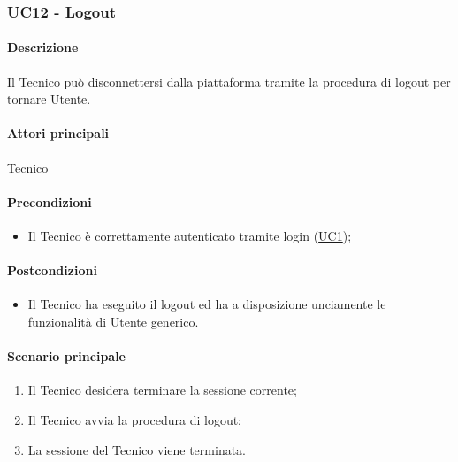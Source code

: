 \subsubsection{UC12 - Logout}\label{UC12}
\paragraph*{Descrizione}
Il Tecnico può disconnettersi dalla piattaforma tramite la procedura di logout per tornare Utente.

\paragraph*{Attori principali}
Tecnico

\paragraph*{Precondizioni}
\begin{itemize}
  \item Il Tecnico è correttamente autenticato tramite login (\hyperref[UC1]{UC1});
\end{itemize}

\paragraph*{Postcondizioni}
\begin{itemize}
  \item Il Tecnico ha eseguito il logout ed ha a disposizione unciamente le funzionalità di Utente generico.
\end{itemize}

\paragraph*{Scenario principale}
\begin{enumerate}
  \item Il Tecnico desidera terminare la sessione corrente;
  \item Il Tecnico avvia la procedura di logout;
  \item La sessione del Tecnico viene terminata.  
\end{enumerate}
